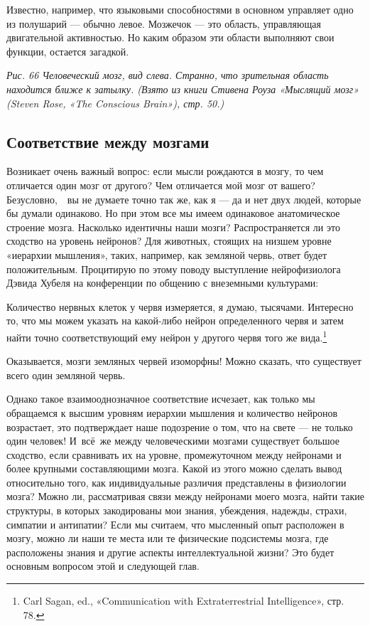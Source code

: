 \documentclass[../main.tex]{subfiles}
\begin{document}
Известно, например, что языковыми способностями в основном управляет одно из полушарий --- обычно левое. Мозжечок --- это область, управляющая двигательной активностью. Но каким образом эти области выполняют свои функции, остается загадкой.

\emph{Рис. 66 Человеческий мозг, вид слева. Странно, что зрительная область находится ближе к затылку. (Взято из книги Стивена Роуза «Мыслящий мозг» (Steven Rose, «The Conscious Brain»), стр. 50.)}


\subsection{Соответствие между мозгами}

Возникает очень важный вопрос: если мысли рождаются в мозгу, то чем отличается один мозг от другого? Чем отличается мой мозг от вашего? Безусловно,~~вы не думаете точно так же, как я --- да и нет двух людей, которые бы думали одинаково. Но при этом все мы имеем одинаковое анатомическое строение мозга. Насколько идентичны наши мозги? Распространяется ли это сходство на уровень нейронов? Для животных, стоящих на низшем уровне «иерархии мышления», таких, например, как земляной червь, ответ будет положительным. Процитирую по этому поводу выступление нейрофизиолога Дэвида Хубеля на конференции по общению с внеземными культурами:

Количество нервных клеток у червя измеряется, я думаю, тысячами. Интересно то, что мы можем указать на какой-либо нейрон определенного червя и затем найти точно соответствующий ему нейрон у другого червя того же вида.\footnote{Carl Sagan, ed., «Communication with Extraterrestrial Intelligence», стр. 78.}

Оказывается, мозги земляных червей изоморфны! Можно сказать, что существует всего один земляной червь.

Однако такое взаимооднозначное соответствие исчезает, как только мы обращаемся к высшим уровням иерархии мышления и количество нейронов возрастает, это подтверждает наше подозрение о том, что на свете --- не только один человек! И~всё~же между человеческими мозгами существует большое сходство, если сравнивать их на уровне, промежуточном между нейронами и более крупными составляющими мозга. Какой из этого можно сделать вывод относительно того, как индивидуальные различия представлены в физиологии мозга? Можно ли, рассматривая связи между нейронами моего мозга, найти такие структуры, в которых закодированы мои знания, убеждения, надежды, страхи, симпатии и антипатии? Если мы считаем, что мысленный опыт расположен в мозгу, можно ли наши те места или те физические подсистемы мозга, где расположены знания и другие аспекты интеллектуальной жизни? Это будет основным вопросом этой и следующей глав.
\end{document}
